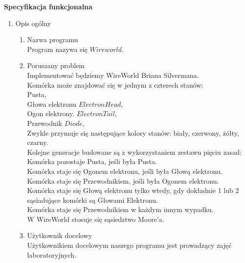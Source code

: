 \documentclass[11pt]{article}
\begin{document}
\begin{huge}
\begin{center}
\textbf{Specyfikacja funkcjonalna}
\end{center}
\end{huge}

 \renewcommand{\labelenumii}{\Roman{enumii}}
 \begin{enumerate}
 
 \item Opis ogólny
 
 \begin{enumerate}[label=\arabic{enumi}.\arabic*.]
 
 \item Nazwa programu\\
 Program nazywa się $Wireworld$.
 \item Poruszany problem\\
 Implementować będziemy WireWorld Briana Silvermana.\\
 Komórka może znajdować się w jednym z czterech stanów:\\
 Pusta,\\
 Głowa elektronu  $ElectronHead$,\\
 Ogon elektrony. $ElectronTail$,\\
 Przewodnik  $Diode$,\\
 Zwykle przymuje się następujące kolory stanów: biały, czerwony, żółty, czarny.\\
 Kolejne generacje budowane są z wykorzystaniem zestawu pięciu zasad:\\
 Komórka pozostaje Pusta, jeśli była Pusta.\\
 Komórka staje się Ogonem elektronu, jeśli była Głową elektronu.\\
 Komórka staje się Przewodnikiem, jeśli była Ogonem elektronu.\\
 Komórka staje się Głową elektronu tylko wtedy, gdy dokładnie 1 lub 2 sąsiadujące komórki są Głowami Elektronu.\\
 Komórka staje się Przewodnikiem w każdym innym wypadku.\\
 W WireWorld stosuje się sąsiedztwo Moore'a.\\
 
 \item Użytkownik docelowy\\
 Użytkownikiem docelowym naszego programu jest prowadzący zajęć laboratoryjnych.\\

 \end{enumerate}
 

\end{enumerate}
\end{document}
